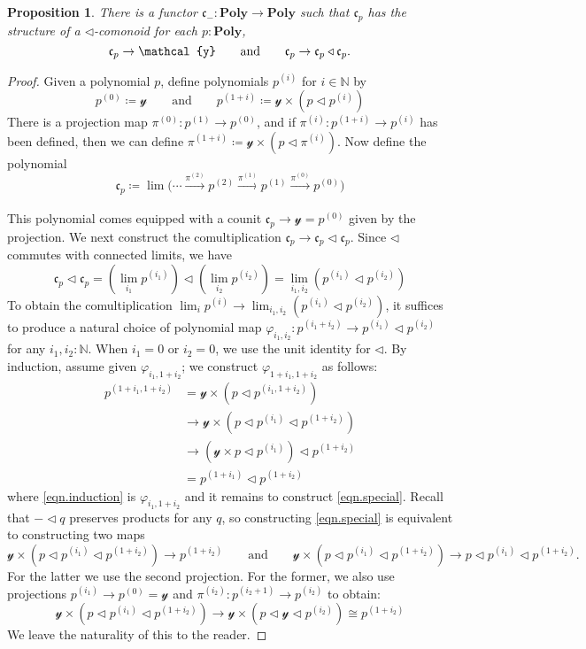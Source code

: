 \documentclass[11pt, one side, article]{memoir}
\theoremstyle{definition}
\theoremstyle{plain}
\newtheorem{proposition}[definitionx]{Proposition}
\newcommand{\Cat}[1]{\mathbf{#1}}%
\newcommand{\To}[2][]{\xrightarrow[#1]{#2}}
\newcommand{\nn}{\mathbb{N}}
\newcommand{\yon}{\mathcal{y}}
\newcommand{\poly}{\Cat{Poly}}
\newcommand{\tri}{\mathbin{\triangleleft}}
\newcommand{\cofree}{\mathfrak{c}}
\newcommand{\qqand}{\qquad\text{and}\qquad}
\newcommand{\coh}[1]{^{(#1)}}
\begin{document}
\begin{proposition}
There is a functor $\cofree_-\colon\poly\to\poly$ such that $\cofree_p$ has the structure of a $\tri$-comonoid for each $p:\poly$,
\[
\cofree_p\to\yon
\qqand
\cofree_p\to\cofree_p\tri\cofree_p.
\qedhere
\]
\end{proposition}
\begin{proof}
Given a polynomial $p$, define polynomials $p^{(i)}$ for $i\in\nn$ by
\[
  p\coh{0}\coloneqq\yon
  \qqand
  p\coh{1+i}\coloneqq\yon\times\left(p\tri p\coh{i}\right)
\]
There is a projection map $\pi\coh{0}\colon p\coh{1}\to p\coh{0}$, and if $\pi\coh{i}\colon p\coh{1+i}\to p\coh{i}$ has been defined, then we can define $\pi\coh{1+i}\coloneqq \yon\times(p\tri\pi\coh{i})$. Now define the polynomial
\begin{equation}\label{eqn.construct_cofree}
\cofree_p\coloneqq\lim\big(\cdots\To{\pi\coh{2}}p\coh{2}\To{\pi\coh{1}}p\coh{1}\To{\pi\coh{0}}p\coh{0}\big)
\end{equation}

This polynomial comes equipped with a counit $\cofree_p\to\yon=p\coh{0}$ given by the projection. We next construct the comultiplication $\cofree_p\to\cofree_p\tri\cofree_p$. Since $\tri$ commutes with connected limits, we have
\[
  \cofree_p\tri\cofree_p=
  \left(\lim_{i_1}p\coh{i_1}\right)\tri\left(\lim_{i_2}p\coh{i_2}\right)=
  \lim_{i_1,i_2}\left(p\coh{i_1}\tri p\coh{i_2}\right)
\]
To obtain the comultiplication $\lim_ip\coh{i}\to\lim_{i_1,i_2}(p\coh{i_1}\tri p\coh{i_2})$, it suffices to produce a natural choice of polynomial map $\varphi_{i_1,i_2}\colon p\coh{i_1+i_2}\to p\coh{i_1}\tri p\coh{i_2}$ for any $i_1,i_2:\nn$. When $i_1=0$ or $i_2=0$, we use the unit identity for $\tri$. By induction, assume given $\varphi_{i_1,1+i_2}$; we construct $\varphi_{1+i_1,1+i_2}$ as follows:
\begin{align}
\nonumber
  p\coh{1+i_1,1+i_2}&=
  \yon\times \left(p\tri p\coh{i_1,1+i_2}\right)\\&\to
\label{eqn.induction}
  \yon\times \left(p\tri p\coh{i_1}\tri p\coh{1+i_2}\right)\\&\to
\label{eqn.special}
  \left(\yon\times p\tri p\coh{i_1}\right)\tri p\coh{1+i_2}\\&=
\nonumber
  p\coh{1+i_1}\tri p\coh{1+i_2}
\end{align}
where \eqref{eqn.induction} is $\varphi_{i_1,1+i_2}$ and it remains to construct \eqref{eqn.special}. Recall that $-\tri q$ preserves products for any $q$, so constructing \eqref{eqn.special} is equivalent to constructing two maps
\[
\yon\times \left(p\tri p\coh{i_1}\tri p\coh{1+i_2}\right)\to p\coh{1+i_2}
\qqand
\yon\times \left(p\tri p\coh{i_1}\tri p\coh{1+i_2}\right)\to p\tri p\coh{i_1}\tri p\coh{1+i_2}.
\]
For the latter we use the second projection. For the former, we also use projections $p\coh{i_1}\to p\coh{0}=\yon$ and $\pi\coh{i_2}\colon p\coh{i_2+1}\to p\coh{i_2}$ to obtain:
\[
\yon\times \left(p\tri p\coh{i_1}\tri p\coh{1+i_2}\right)\to
\yon\times \left(p\tri\yon\tri p\coh{i_2}\right)\cong p\coh{1+i_2}
\]
We leave the naturality of this to the reader.


\end{proof}
\end{document}
